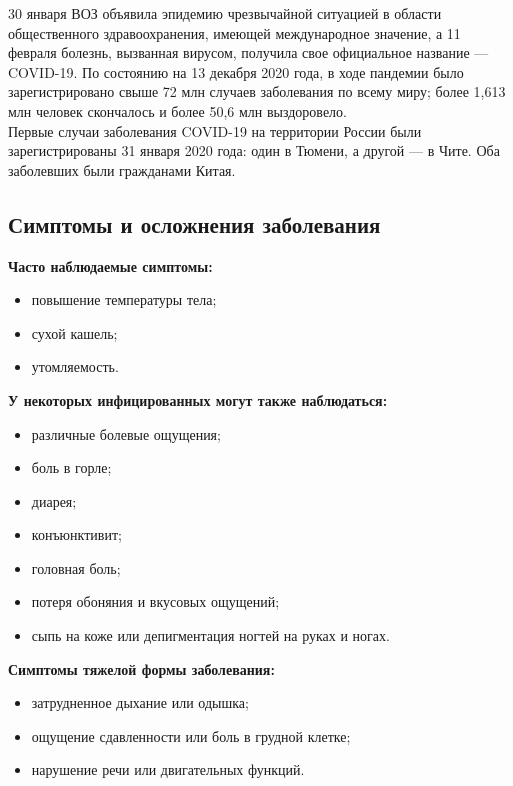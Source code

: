 \documentclass[a4paper, 12pt]{extarticle}
\begin{document}
30 января ВОЗ объявила эпидемию чрезвычайной ситуацией в области общественного
здравоохранения, имеющей международное значение, а 11 февраля болезнь,
вызванная вирусом, получила свое официальное название — COVID-19. По состоянию
на 13 декабря 2020 года, в ходе пандемии было зарегистрировано свыше 72 млн
случаев заболевания по всему миру; более  1,613 млн человек скончалось и более
50,6 млн выздоровело.
\\

Первые случаи заболевания COVID-19 на территории России были зарегистрированы
31 января 2020 года: один в Тюмени, а другой — в Чите. Оба заболевших были
гражданами Китая.
\newpage

\subsection{Симптомы и осложнения заболевания}
\vspace{3mm}

\textbf{Часто наблюдаемые симптомы:}
\begin{itemize}
    \item повышение температуры тела;
    \item сухой кашель;
    \item утомляемость.
\end{itemize}

\vspace{5mm}

\textbf{У некоторых инфицированных могут также наблюдаться:}
\begin{itemize}
    \item различные болевые ощущения;
    \item боль в горле;
    \item диарея;
    \item конъюнктивит;
    \item головная боль;
    \item потеря обоняния и вкусовых ощущений;
    \item сыпь на коже или депигментация ногтей на руках и ногах.
\end{itemize}

\vspace{5mm}

\textbf{Симптомы тяжелой формы заболевания:}
\begin{itemize}
    \item затрудненное дыхание или одышка;
    \item ощущение сдавленности или боль в грудной клетке;
    \item нарушение речи или двигательных функций.
\end{itemize}
\end{document}
